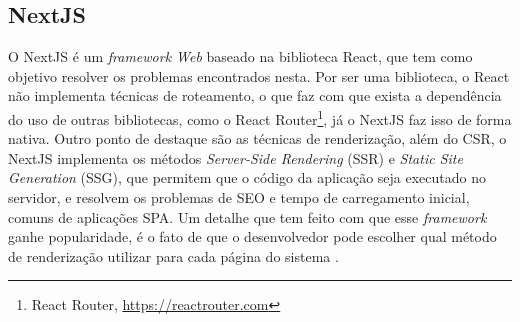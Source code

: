 \subsection{NextJS}
\label{sec-fundteo-framework-next}
O NextJS é um \textit{framework Web} baseado na biblioteca React, que tem como objetivo 
resolver os problemas encontrados nesta. Por ser uma biblioteca, o React não implementa 
técnicas de roteamento, o que faz com que exista a dependência do uso de outras bibliotecas, 
como o React Router\footnote{React Router, \url{https://reactrouter.com}},
já o NextJS faz isso de forma nativa. Outro ponto de destaque são as técnicas de renderização, 
além do CSR, o NextJS implementa os métodos \textit{Server-Side Rendering} (SSR)
e \textit{Static Site Generation} (SSG), que permitem que o código da aplicação seja executado
no servidor, e resolvem os problemas de SEO e tempo de carregamento inicial, comuns de 
aplicações SPA. Um detalhe que tem feito com que esse \textit{framework}
ganhe popularidade, é o fato de que o desenvolvedor pode escolher qual método de renderização
utilizar para cada página do sistema \cite{nextjs:2023}.

